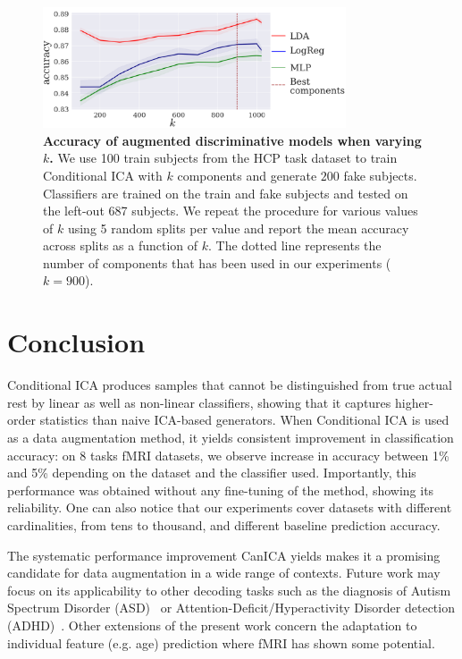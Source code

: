 \begin{figure}
  \centerline{\includegraphics[width=0.8\textwidth]{figures/condica/sensitivity.pdf}}
  \caption{\textbf{Accuracy of augmented discriminative models when
      varying $k$.} We use 100 train subjects from the HCP task dataset to train Conditional ICA with $k$ components and generate $200$ fake subjects.
    Classifiers are trained on the train and fake subjects and tested on the
    left-out 687 subjects. We repeat the procedure
    for various values of $k$ using 5 random splits per value and
    report the mean accuracy across splits as a function of $k$.
    The dotted line represents the number of components that has been
    used in our experiments ($k=900$).
  }
  \label{condica:sensitivity:fig}
\end{figure}






\section{Conclusion}
Conditional ICA produces samples that cannot be distinguished from true actual rest by linear as well as non-linear classifiers, showing that it captures higher-order statistics than naive ICA-based generators.
%
When Conditional ICA is used as a data augmentation method, it yields consistent
improvement in classification accuracy: on 8 tasks fMRI datasets, we observe
increase in accuracy between 1\% and 5\% depending on the dataset and the
classifier used.
Importantly, this performance was obtained without any fine-tuning of
the method, showing its reliability. One can also notice that our experiments cover datasets with different cardinalities, from tens to thousand, and different baseline prediction accuracy.

The systematic performance improvement CanICA yields
makes it a promising candidate for data augmentation in a wide range of
contexts. Future work may focus on its applicability to other decoding tasks
such as the diagnosis of Autism Spectrum Disorder
(ASD)~\cite{eslami2019asd,eslami2019auto,dvornek2017identifying} or
Attention-Deficit/Hyperactivity Disorder detection (ADHD)~\cite{mao2019spatio}. Other extensions of the present work concern the adaptation to
individual feature (e.g. age) prediction where
fMRI has shown some potential.
%